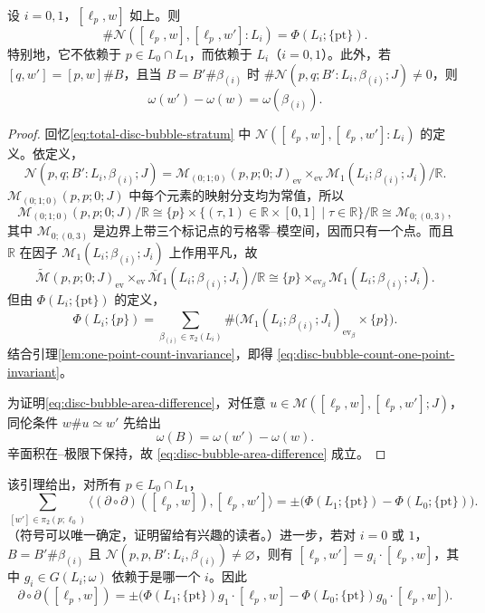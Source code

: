 \begin{lemma}
\label{lem:disc-bubble-stratum-count}
设 $i=0,1$，$[\ell_p,w]$ 如上。则
\begin{equation}
 \#\mathcal N([\ell_p,w],[\ell_p,w']:L_i)=\Phi(L_i;\{\mathrm{pt}\}).
\label{eq:disc-bubble-count-one-point-invariant}
\end{equation}
特别地，它不依赖于 $p\in L_0\cap L_1$，而依赖于 $L_i$（$i=0,1$）。此外，若
$[q,w']=[p,w]\#B$，且当 $B=B'\#\beta_{(i)}$ 时
$\#\mathcal N(p,q;B':L_i,\beta_{(i)};J)\neq0$，则
\begin{equation}
 \omega(w')-\omega(w)=\omega(\beta_{(i)}).
\label{eq:disc-bubble-area-difference}
\end{equation}
\end{lemma}

\begin{proof}
回忆\eqref{eq:total-disc-bubble-stratum} 中
$\mathcal N([\ell_p,w],[\ell_p,w']:L_i)$ 的定义。依定义，
\[
 \mathcal N(p,q;B':L_i,\beta_{(i)};J)
 =\mathcal M_{(0;1;0)}(p,p;0;J)_{\operatorname{ev}}
 \times_{\operatorname{ev}}\mathcal M_1(L_i;\beta_{(i)};J_i)/\mathbb R.
\]
$\mathcal M_{(0;1;0)}(p,p;0;J)$ 中每个元素的映射分支均为常值，所以
\[
 \mathcal M_{(0;1;0)}(p,p;0;J)/\mathbb R
 \cong\{p\}\times
 \{(\tau,1)\in\mathbb R\times[0,1]\mid\tau\in\mathbb R\}/\mathbb R
 \cong\mathcal M_{0;(0,3)},
\]
其中 $\mathcal M_{0;(0,3)}$ 是边界上带三个标记点的亏格零\personDeligne{}--\personMumford{}模空间，因而只有一个点。而且 $\mathbb R$ 在因子
$\mathcal M_1(L_i;\beta_{(i)};J_i)$ 上作用平凡，故
\[
 \widetilde{\mathcal M}(p,p;0;J)_{\operatorname{ev}}
 \times_{\operatorname{ev}}\overline{\mathcal M}_1(L_i;\beta_{(i)};J_i)/\mathbb R
 \cong\{p\}\times_{\operatorname{ev}_\beta}
 \mathcal M_1(L_i;\beta_{(i)};J_i).
\]
但由 $\Phi(L_i;\{\mathrm{pt}\})$ 的定义，
\[
 \Phi(L_i;\{p\})
 =\sum_{\beta_{(i)}\in\pi_2(L_i)}
 \#\bigl(\mathcal M_1(L_i;\beta_{(i)};J_i)_{\operatorname{ev}_\beta}
 \times\{p\}\bigr).
\]
结合引理\ref{lem:one-point-count-invariance}，即得
\eqref{eq:disc-bubble-count-one-point-invariant}。

为证明\eqref{eq:disc-bubble-area-difference}，对任意
$u\in\mathcal M([\ell_p,w],[\ell_p,w'];J)$，同伦条件 $w\#u\simeq w'$ 先给出
\[
 \omega(B)=\omega(w')-\omega(w).
\]
辛面积在\personGromov{}--\personFloer{}极限下保持，故
\eqref{eq:disc-bubble-area-difference} 成立。
\end{proof}

该引理给出，对所有 $p\in L_0\cap L_1$，
\[
 \sum_{[w']\in\pi_2(p;\ell_0)}
 \bigl\langle(\partial\circ\partial)([\ell_p,w]),[\ell_p,w']\bigr\rangle
 =\pm\bigl(\Phi(L_1;\{\mathrm{pt}\})-\Phi(L_0;\{\mathrm{pt}\})\bigr).
\]
（符号可以唯一确定，证明留给有兴趣的读者。）进一步，若对 $i=0$ 或 $1$，
$B=B'\#\beta_{(i)}$ 且
$\mathcal N(p,p,B':L_i,\beta_{(i)})\neq\varnothing$，则有
$[\ell_p,w']=g_i\cdot[\ell_p,w]$，其中
$g_i\in G(L_i;\omega)$ 依赖于是哪一个 $i$。因此
\[
 \partial\circ\partial([\ell_p,w])
 =\pm\bigl(\Phi(L_1;\{\mathrm{pt}\})g_1\cdot[\ell_p,w]
 -\Phi(L_0;\{\mathrm{pt}\})g_0\cdot[\ell_p,w]\bigr).
\]

